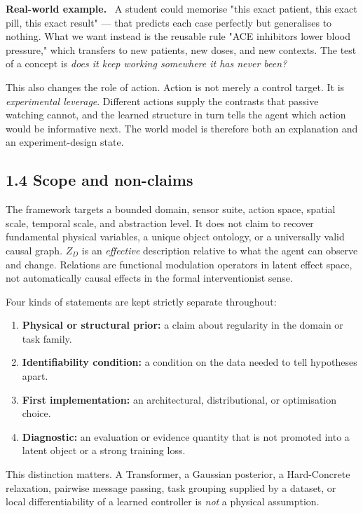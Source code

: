 \documentclass[11pt]{article}
\newenvironment{example}{%
  \par\smallskip\noindent\begin{minipage}{\textwidth}%
  \color{teal!60!black}\small
  \textbf{\color{teal!70!black}Real-world example.}\
}{%
  \end{minipage}\par\smallskip}
\begin{document}
\begin{example}
A student could memorise "this exact patient, this exact pill, this exact result" --- that predicts each case perfectly but
generalises to nothing. What we want instead is the reusable rule "ACE inhibitors lower blood pressure," which transfers to new
patients, new doses, and new contexts. The test of a concept is \emph{does it keep working somewhere it has never been?}
\end{example}

This also changes the role of action. Action is not merely a control target. It is \emph{experimental leverage}. Different actions
supply the contrasts that passive watching cannot, and the learned structure in turn tells the agent which action would be
informative next. The world model is therefore both an explanation and an experiment-design state.

\subsection*{1.4 Scope and non-claims}

The framework targets a bounded domain, sensor suite, action space, spatial scale, temporal scale, and abstraction level. It does
not claim to recover fundamental physical variables, a unique object ontology, or a universally valid causal graph. $Z_D$ is an
\emph{effective} description relative to what the agent can observe and change. Relations are functional modulation operators in
latent effect space, not automatically causal effects in the formal interventionist sense.

Four kinds of statements are kept strictly separate throughout:

\begin{enumerate}
\item \textbf{Physical or structural prior:} a claim about regularity in the domain or task family.
\item \textbf{Identifiability condition:} a condition on the data needed to tell hypotheses apart.
\item \textbf{First implementation:} an architectural, distributional, or optimisation choice.
\item \textbf{Diagnostic:} an evaluation or evidence quantity that is not promoted into a latent object or a strong training loss.
\end{enumerate}

This distinction matters. A Transformer, a Gaussian posterior, a Hard-Concrete relaxation, pairwise message passing, task
grouping supplied by a dataset, or local differentiability of a learned controller is \emph{not} a physical assumption.
\end{document}
